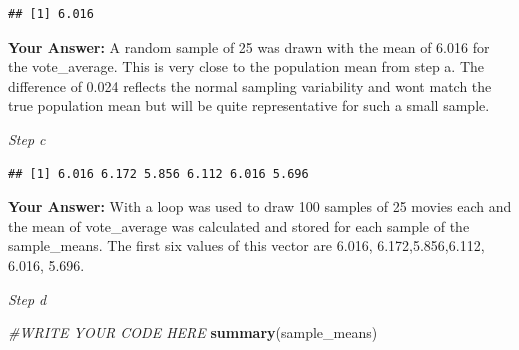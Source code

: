 \documentclass[
]{article}
\newenvironment{Shaded}{\begin{snugshade}}{\end{snugshade}}
\newcommand{\CommentTok}[1]{\textcolor[rgb]{0.56,0.35,0.01}{\textit{#1}}}
\newcommand{\ControlFlowTok}[1]{\textcolor[rgb]{0.13,0.29,0.53}{\textbf{#1}}}
\newcommand{\DecValTok}[1]{\textcolor[rgb]{0.00,0.00,0.81}{#1}}
\newcommand{\DocumentationTok}[1]{\textcolor[rgb]{0.56,0.35,0.01}{\textbf{\textit{#1}}}}
\newcommand{\FunctionTok}[1]{\textcolor[rgb]{0.13,0.29,0.53}{\textbf{#1}}}
\newcommand{\NormalTok}[1]{#1}
\newcommand{\OtherTok}[1]{\textcolor[rgb]{0.56,0.35,0.01}{#1}}
\newcommand{\SpecialCharTok}[1]{\textcolor[rgb]{0.81,0.36,0.00}{\textbf{#1}}}
\begin{document}
\begin{verbatim}
## [1] 6.016
\end{verbatim}

\textbf{Your Answer:} A random sample of 25 was drawn with the mean of
6.016 for the vote\_average. This is very close to the population mean
from step a. The difference of 0.024 reflects the normal sampling
variability and wont match the true population mean but will be quite
representative for such a small sample.

\emph{Step c}

\begin{Shaded}
\end{Shaded}

\begin{verbatim}
## [1] 6.016 6.172 5.856 6.112 6.016 5.696
\end{verbatim}

\textbf{Your Answer:} With a loop was used to draw 100 samples of 25
movies each and the mean of vote\_average was calculated and stored for
each sample of the sample\_means. The first six values of this vector
are 6.016, 6.172,5.856,6.112, 6.016, 5.696.

\emph{Step d}

\begin{Shaded}
\begin{Highlighting}[]
\CommentTok{\#WRITE YOUR CODE HERE}
\FunctionTok{summary}\NormalTok{(sample\_means)}
\end{Highlighting}
\end{Shaded}
\end{document}
